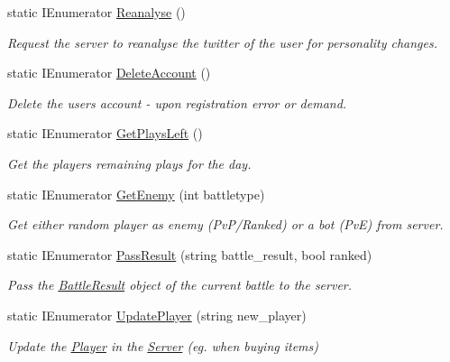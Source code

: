 \begin{DoxyCompactItemize}
\mbox{\label{class_server_ae77fb220463cc2e8a103b90aeb4e80bb}} 
static I\+Enumerator \mbox{\hyperlink{class_server_ae77fb220463cc2e8a103b90aeb4e80bb}{Reanalyse}} ()
\begin{DoxyCompactList}\small\item\em Request the server to reanalyse the twitter of the user for personality changes. \end{DoxyCompactList}\item 
\mbox{\label{class_server_a3f176e4b6cca1229cba9694566d25e32}} 
static I\+Enumerator \mbox{\hyperlink{class_server_a3f176e4b6cca1229cba9694566d25e32}{Delete\+Account}} ()
\begin{DoxyCompactList}\small\item\em Delete the user\textquotesingle{}s account -\/ upon registration error or demand. \end{DoxyCompactList}\item 
\mbox{\label{class_server_ab91c9efe68369b07f5f4d0d179926f48}} 
static I\+Enumerator \mbox{\hyperlink{class_server_ab91c9efe68369b07f5f4d0d179926f48}{Get\+Plays\+Left}} ()
\begin{DoxyCompactList}\small\item\em Get the player\textquotesingle{}s remaining plays for the day. \end{DoxyCompactList}\item 
\mbox{\label{class_server_ab8763dec1a3a83e91962022cbcf405db}} 
static I\+Enumerator \mbox{\hyperlink{class_server_ab8763dec1a3a83e91962022cbcf405db}{Get\+Enemy}} (int battletype)
\begin{DoxyCompactList}\small\item\em Get either random player as enemy (Pv\+P/\+Ranked) or a bot (PvE) from server. \end{DoxyCompactList}\item 
\mbox{\label{class_server_ac8137eb1cd7752cf3231cd3d1539a849}} 
static I\+Enumerator \mbox{\hyperlink{class_server_ac8137eb1cd7752cf3231cd3d1539a849}{Pass\+Result}} (string battle\+\_\+result, bool ranked)
\begin{DoxyCompactList}\small\item\em Pass the \mbox{\hyperlink{class_battle_result}{Battle\+Result}} object of the current battle to the server. \end{DoxyCompactList}\item 
\mbox{\label{class_server_a80d81b83c802dfa2afd77f17dae0b28e}} 
static I\+Enumerator \mbox{\hyperlink{class_server_a80d81b83c802dfa2afd77f17dae0b28e}{Update\+Player}} (string new\+\_\+player)
\begin{DoxyCompactList}\small\item\em Update the \mbox{\hyperlink{class_player}{Player}} in the \mbox{\hyperlink{class_server}{Server}} (eg. when buying items) \end{DoxyCompactList}\end{DoxyCompactItemize}
